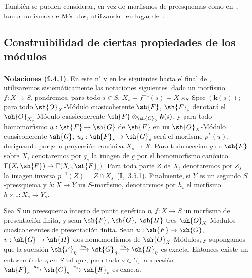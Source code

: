 También se pueden considerar, en vez de morfismos de preesquemas como en~, homomorfismos de Módulos, utilizando~ en lugar de~.


\subsection{Construibilidad de ciertas propiedades de los módulos}
\label{subsection:IV.9.4}

\begin{env}[9.4.1]
\label{IV.9.4.1}
\textbf{Notaciones (9.4.1).}
En este n\textsuperscript{o} y en los siguientes hasta el final de , utilizaremos sistemáticamente las notaciones siguientes: dado un morfismo $f:X\to S$, pondremos, para todo $s\in S$, $X_s=f^{-1}(s)=X\times_S\operatorname{Spec}(\boldsymbol{k}(s))$; para todo $\sh{O}_X$-Módulo cuasicoherente $\sh{F}$, $\sh{F}_s$ denotará el $\sh{O}_{X_s}$-Módulo cuasicoherente $\sh{F}\otimes_{\sh{O}_S}\boldsymbol{k}(s)$, y para todo homomorfismo $u:\sh{F}\to\sh{G}$ de $\sh{F}$ en un $\sh{O}_X$-Módulo cuasicoherente $\sh{G}$, $u_s:\sh{F}_s\to\sh{G}_s$ será el morfismo $p^*(u)$, designando por $p$ la proyección canónica $X_s\to X$.
Para toda sección $g$ de $\sh{F}$ sobre $X$, denotaremos por $g_s$ la imagen de $g$ por el homomorfismo canónico $\Gamma(X,\sh{F})\to\Gamma(X_s,\sh{F}_s)$.
Para toda parte $Z$ de $X$, denotaremos por $Z_s$ la imagen inversa $p^{-1}(Z)=Z\cap X_s$~(\textbf{I},~3.6.1).
Finalmente, si $Y$ es un segundo $S$-preesquema y $h:X\to Y$ un $S$-morfismo, denotaremos por $h_s$ el morfismo $h\times 1:X_s\to Y_s$.
\end{env}

\begin{proposition}[9.4.2]
\label{IV.9.4.2}
Sea $S$ un preesquema íntegro de punto genérico $\eta$, $f:X\to S$ un morfismo de presentación finita, y sean $\sh{F}$, $\sh{G}$, $\sh{H}$ tres $\sh{O}_X$-Módulos cuasicoherentes de presentación finita.
Sean $u:\sh{F}\to\sh{G}$, $v:\sh{G}\to\sh{H}$ dos homomorfismos de $\sh{O}_X$-Módulos, y supongamos que la sucesión $\sh{F}_\eta\xrightarrow{u_\eta}\sh{G}_\eta\xrightarrow{v_\eta}\sh{H}_\eta$ es exacta.
Entonces existe un entorno $U$ de $\eta$ en $S$ tal que, para todo $s\in U$, la sucesión $\sh{F}_s\xrightarrow{u_s}\sh{G}_s\xrightarrow{v_s}\sh{H}_s$ es exacta.
\end{proposition}

